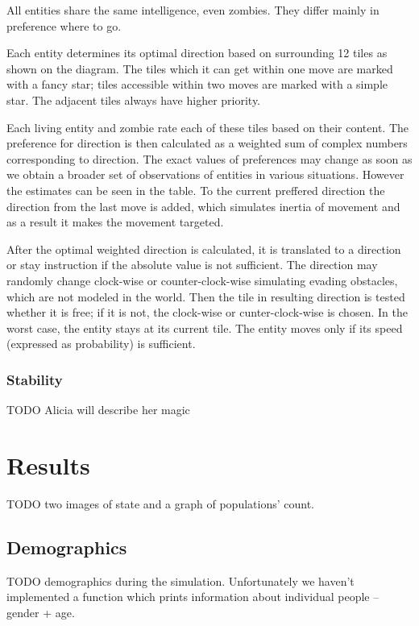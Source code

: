 \documentclass[a4paper]{article}
\begin{document}
All entities share the same intelligence, even zombies.
They differ mainly in preference where to go.

Each entity determines its optimal direction based on surrounding 12 tiles as shown on the diagram.
The tiles which it can get within one move are marked with a fancy star; tiles accessible within two moves are marked with a simple star.
The adjacent tiles always have higher priority.

Each living entity and zombie rate each of these tiles based on their content.
The preference for direction is then calculated as a weighted sum of complex numbers corresponding to direction.
The exact values of preferences may change as soon as we obtain a broader set of observations of entities in various situations.
However the estimates can be seen in the table.
To the current preffered direction the direction from the last move is added, which simulates inertia of movement and as a result it makes the movement targeted.

After the optimal weighted direction is calculated, it is translated to a direction or stay instruction if the absolute value is not sufficient.
The direction may randomly change clock-wise or counter-clock-wise simulating evading obstacles, which are not modeled in the world.
Then the tile in resulting direction is tested whether it is free; if it is not, the clock-wise or cunter-clock-wise is chosen.
In the worst case, the entity stays at its current tile.
The entity moves only if its speed (expressed as probability) is sufficient.

\subsubsection{Stability}

TODO Alicia will describe her magic

\section{Results}

TODO two images of state and a graph of populations' count.

\subsection{Demographics}

TODO demographics during the simulation.
Unfortunately we haven't implemented a function which prints information about individual people -- gender + age.
\end{document}
